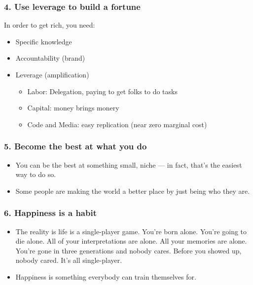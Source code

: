 \begin{frame}[fragile]\frametitle{4. Use leverage to build a fortune}
In order to get rich, you need:
\begin{itemize}
\item Specific knowledge
\item Accountability (brand)
\item Leverage (amplification)
\begin{itemize}
\item Labor: Delegation, paying to get folks to do tasks
\item Capital: money brings monery
\item  Code and Media: easy replication (near zero marginal cost)
\end{itemize}
\end{itemize}

\end{frame}

\begin{frame}[fragile]\frametitle{5. Become the best at what you do}

\begin{itemize}
\item  You can be the best at something small, niche — in
fact, that’s the easiest way to do so.
\item Some people are making the world a better place by just being who they are.
\end{itemize}

\end{frame}

\begin{frame}[fragile]\frametitle{6. Happiness is a habit}

\begin{itemize}
\item  The reality is life is a single-player game. You’re born alone. You’re going to die alone. All of
your interpretations are alone. All your memories are alone. You’re gone in three
generations and nobody cares. Before you showed up, nobody cared. It’s all single-player.
\item Happiness is something everybody
can train themselves for.
\end{itemize}

\end{frame}

